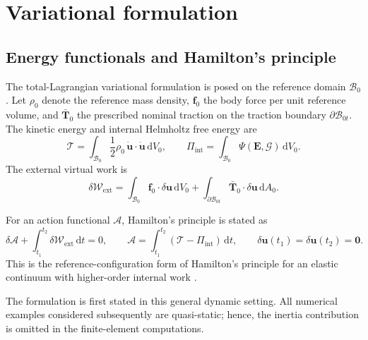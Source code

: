 \documentclass[preprint,12pt]{elsarticle}
\begin{document}
\section{Variational formulation}
\label{sec:variational}

\subsection{Energy functionals and Hamilton's principle}
\label{sec:variational-principle}

The total-Lagrangian variational formulation is posed on the reference domain
$\mathcal{B}_0$. Let $\rho_0$ denote the reference mass density,
$\mathbf{f}_0$ the body force per unit reference volume, and
$\bar{\mathbf{T}}_0$ the prescribed nominal traction on the traction
boundary $\partial\mathcal{B}_{0t}$. The kinetic energy and internal
Helmholtz free energy are
\begin{equation}
 \mathcal{T}
 =\int_{\mathcal{B}_0}\frac{1}{2}\rho_0\,
 \dot{\mathbf{u}}\cdot\dot{\mathbf{u}}\,\mathrm{d}V_0,
 \qquad
 \Pi_{\mathrm{int}}
 =\int_{\mathcal{B}_0}
 \Psi\left(\mathbf{E},\bm{\mathcal{G}}\right)\,\mathrm{d}V_0.
 \label{eq:kinetic-and-internal-energy}
\end{equation}
The external virtual work is
\begin{equation}
 \delta\mathcal{W}_{\mathrm{ext}}
 =\int_{\mathcal{B}_0}\mathbf{f}_0\cdot\delta\mathbf{u}\,\mathrm{d}V_0
 +\int_{\partial\mathcal{B}_{0t}}
 \bar{\mathbf{T}}_0\cdot\delta\mathbf{u}\,\mathrm{d}A_0.
 \label{eq:external-virtual-work}
\end{equation}

For an action functional $\mathcal{A}$, Hamilton's principle is stated as
\begin{equation}
 \delta\mathcal{A}
 +\int_{t_1}^{t_2}\delta\mathcal{W}_{\mathrm{ext}}\,\mathrm{d}t=0,
 \qquad
 \mathcal{A}
 =\int_{t_1}^{t_2}
 \left(\mathcal{T}-\Pi_{\mathrm{int}}\right)\,\mathrm{d}t,
 \qquad
 \delta\mathbf{u}(t_1)=\delta\mathbf{u}(t_2)=\mathbf{0}.
 \label{eq:hamilton-principle}
\end{equation}
This is the reference-configuration form of Hamilton's principle for an
elastic continuum with higher-order internal work
\cite{Hamilton1834,SimoHughes1998,Germain1973}.

The formulation is first stated in this general dynamic setting. All
numerical examples considered subsequently are quasi-static; hence, the
inertia contribution is omitted in the finite-element computations.
\end{document}
